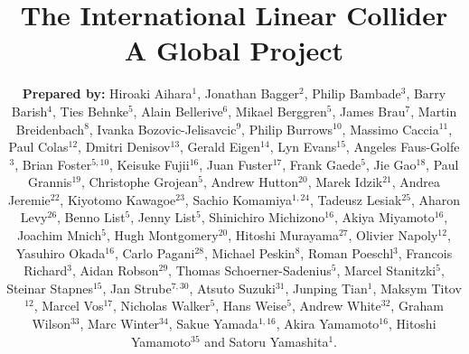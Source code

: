 \documentclass[%
 reprint,
 floatfix,
 amsmath,amssymb,
 aps,
]{revtex4-1}
\begin{document}

\title{The International Linear Collider \\ A Global Project}%

\author{\textbf{Prepared by:}
Hiroaki Aihara$^1$, Jonathan Bagger$^2$, Philip Bambade$^3$, Barry Barish$^4$,  Ties Behnke$^5$, Alain Bellerive$^6$, Mikael Berggren$^5$, James Brau$^7$, Martin Breidenbach$^8$, 
Ivanka Bozovic-Jelisavcic$^9$,
Philip Burrows$^{10}$, Massimo Caccia$^{11}$, Paul Colas$^{12}$, Dmitri Denisov$^{13}$, Gerald Eigen$^{14}$, Lyn Evans$^{15}$, Angeles Faus-Golfe$^{3}$, Brian Foster$^{5,10}$, Keisuke Fujii$^{16}$, Juan Fuster$^{17}$, Frank Gaede$^{5}$, Jie Gao$^{18}$, Paul Grannis$^{19}$, Christophe Grojean$^{5}$, Andrew Hutton$^{20}$, Marek Idzik$^{21}$, Andrea Jeremie$^{22}$, Kiyotomo Kawagoe$^{23}$, Sachio Komamiya$^{1,24}$, Tadeusz Lesiak$^{25}$, Aharon Levy$^{26}$, Benno List$^{5}$, Jenny List$^{5}$, Shinichiro Michizono$^{16}$, Akiya Miyamoto$^{16}$, Joachim Mnich$^{5}$, Hugh Montgomery$^{20}$, Hitoshi Murayama$^{27}$, Olivier Napoly$^{12}$, Yasuhiro Okada$^{16}$, Carlo Pagani$^{28}$, Michael Peskin$^{8}$, Roman Poeschl$^{3}$, Francois Richard$^{3}$, Aidan Robson$^{29}$, Thomas Schoerner-Sadenius$^{5}$, Marcel Stanitzki$^5$, Steinar Stapnes$^{15}$, Jan Strube$^{7,30}$, Atsuto Suzuki$^{31}$, Junping Tian$^{1}$, Maksym Titov$^{12}$, Marcel Vos$^{17}$, Nicholas Walker$^{5}$, Hans Weise$^{5}$, Andrew White$^{32}$, Graham Wilson$^{33}$, Marc Winter$^{34}$, Sakue Yamada$^{1,16}$, Akira Yamamoto$^{16}$, Hitoshi Yamamoto$^{35}$ and Satoru Yamashita$^{1}$. }
\end{document}
